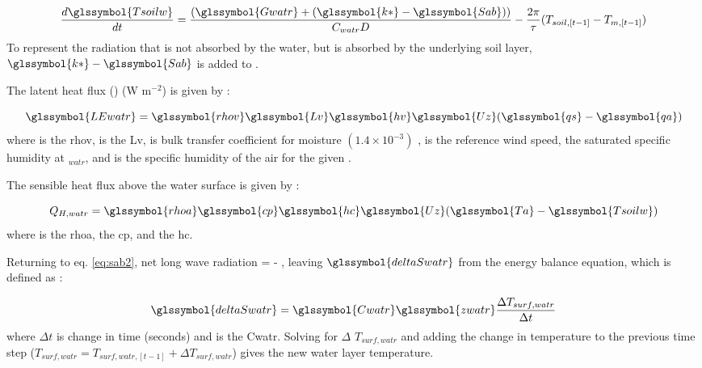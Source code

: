 \documentclass[final,3p,times,authoryear]{elsarticle}
\begin{document}
\begin{equation}
\frac{d \glssymbol{Tsoilw}}{d t}= \frac{(\glssymbol{Gwatr} + (\glssymbol{k*} - \glssymbol{Sab}))}{C_{watr} D} - \frac{2 \pi}{\tau} (T_{soil,[t-1]} - T_{m,[t-1]})
\end{equation} To represent the radiation that is not absorbed by the water, but is absorbed by the underlying soil layer, $\glssymbol{k*} - \glssymbol{Sab}$ is added to .

The latent heat flux () (W m$^{-2}$) is given by \cite{Arya2001}:

\begin{equation} 
\glssymbol{LEwatr} = \glssymbol{rhov} \glssymbol{Lv} \glssymbol{hv} \glssymbol{Uz} (\glssymbol{qs} - \glssymbol{qa})
\label{eq:lewtr} \end{equation} where  is the \glsdesc{rhov},  is the \glsdesc{Lv},  is bulk transfer coefficient for moisture $(1.4\times10^{-3})$ \citep{Hicks1972,Jones2005},  is the reference wind speed,  the saturated specific humidity at $_{watr}$, and  is the specific humidity of the air for the given . 

The sensible heat flux above the water surface is given by \cite{MolinaMartinez2006}:

\begin{equation} 
Q_{H,watr} = \glssymbol{rhoa} \glssymbol{cp} \glssymbol{hc} \glssymbol{Uz} (\glssymbol{Ta}-\glssymbol{Tsoilw})
\label{eq:hwtr} \end{equation} where  is the \glsdesc{rhoa},  the \glsdesc{cp}, and  the \glsdesc{hc}. 

Returning to eq. \ref{eq:sab2}, net long wave radiation  =  - , leaving $\glssymbol{deltaSwatr}$ from the energy balance equation, which is defined as \citep{MolinaMartinez2006}:

\begin{equation} 
\glssymbol{deltaSwatr} = \glssymbol{Cwatr} \glssymbol{zwatr} \frac{\Delta T_{surf,watr}}{\Delta t}
\label{eq:swrt} \end{equation} where $\Delta t$ is change in time (seconds) and  is the \glsdesc{Cwatr}. Solving for $\Delta$ $T_{surf,watr}$ and adding the change in temperature to the previous time step ($T_{surf,watr} = T_{surf,watr,[t-1]}  + \Delta T_{surf,watr}$) gives the new water layer temperature. 
\end{document}
